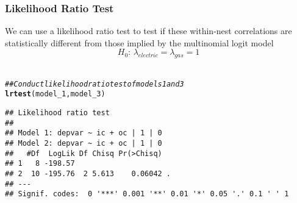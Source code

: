 \documentclass{beamer}\usepackage[]{graphicx}\usepackage[]{xcolor}
\makeatletter
\newcommand{\hlcom}[1]{\textcolor[rgb]{0.678,0.584,0.686}{\textit{#1}}}%
\newcommand{\hlstd}[1]{\textcolor[rgb]{0.345,0.345,0.345}{#1}}%
\newcommand{\hlkwd}[1]{\textcolor[rgb]{0.737,0.353,0.396}{\textbf{#1}}}%
\newenvironment{kframe}{%
 \def\at@end@of@kframe{}%
 \ifinner\ifhmode%
  \def\at@end@of@kframe{\end{minipage}}%
  \begin{minipage}{\columnwidth}%
 \fi\fi%
 \def\FrameCommand##1{\hskip\@totalleftmargin \hskip-\fboxsep
 \colorbox{shadecolor}{##1}\hskip-\fboxsep
     \hskip-\linewidth \hskip-\@totalleftmargin \hskip\columnwidth}%
 \MakeFramed {\advance\hsize-\width
   \@totalleftmargin\z@ \linewidth\hsize
   \@setminipage}}%
 {\par\unskip\endMakeFramed%
 \at@end@of@kframe}
\newenvironment{knitrout}{}{} %
\makeatother
\begin{document}
\begin{frame}[fragile]\frametitle{Likelihood Ratio Test}
    We can use a likelihood ratio test to test if these within-nest correlations are statistically different from those implied by the multinomial logit model
    $$H_0 \text{: } \lambda_{electric} = \lambda_{gas} = 1$$ \\
\begin{knitrout}\footnotesize
{}\color{fgcolor}\begin{kframe}
\begin{alltt}
\hlcom{## Conduct likelihood ratio test of models 1 and 3}
\hlkwd{lrtest}\hlstd{(model_1, model_3)}
\end{alltt}
\begin{verbatim}
## Likelihood ratio test
## 
## Model 1: depvar ~ ic + oc | 1 | 0
## Model 2: depvar ~ ic + oc | 1 | 0
##   #Df  LogLik Df Chisq Pr(>Chisq)  
## 1   8 -198.57                      
## 2  10 -195.76  2 5.613    0.06042 .
## ---
## Signif. codes:  0 '***' 0.001 '**' 0.01 '*' 0.05 '.' 0.1 ' ' 1
\end{verbatim}
\end{kframe}
\end{knitrout}
\end{frame}
\end{document}
